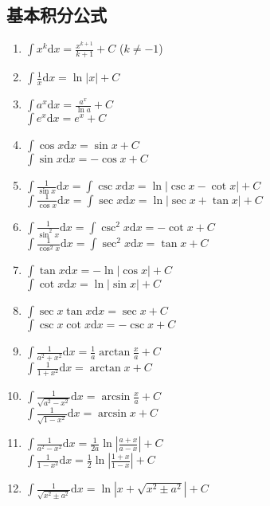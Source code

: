 \documentclass[UTF8]{ctexart}
\theoremstyle{remark}
\begin{document}
		\subsection{基本积分公式}
		\begin{enumerate}
			\item \(\int x^{k} \mathrm{d}x=\frac{x^{k + 1}}{k + 1}+C\) (\(k\neq - 1\))
			\item \(\int\frac{1}{x} \mathrm{d}x=\ln|x|+C\)
			\item \(\int a^{x} \mathrm{d}x=\frac{a^{x}}{\ln a}+C\)\\\(\int e^{x} \mathrm{d}x=e^{x}+C\)
			\item \(\int\cos x \mathrm{d}x=\sin x+C\)\\\(\int\sin x \mathrm{d}x=-\cos x+C\)
			\item \(\int\frac{1}{\sin x} \mathrm{d}x=\int\csc x \mathrm{d}x=\ln|\csc x - \cot x|+C\)\\\(\int\frac{1}{\cos x} \mathrm{d}x=\int\sec x \mathrm{d}x=\ln|\sec x + \tan x|+C\)
			\item \(\int\frac{1}{\sin^{2}x} \mathrm{d}x=\int\csc^{2}x \mathrm{d}x=-\cot x+C\)\\\(\int\frac{1}{\cos^{2}x} \mathrm{d}x=\int\sec^{2}x \mathrm{d}x=\tan x+C\)
			\item \(\int\tan x \mathrm{d}x=-\ln|\cos x|+C\)\\\(\int\cot x \mathrm{d}x=\ln|\sin x|+C\)
			\item \(\int\sec x\tan x \mathrm{d}x=\sec x+C\)\\\(\int\csc x\cot x \mathrm{d}x=-\csc x+C\)
			\item \(\int\frac{1}{a^{2}+x^{2}} \mathrm{d}x=\frac{1}{a}\arctan\frac{x}{a}+C\)\\\(\int\frac{1}{1 + x^{2}} \mathrm{d}x=\arctan x+C\)
			\item \(\int\frac{1}{\sqrt{a^{2}-x^{2}}} \mathrm{d}x=\arcsin\frac{x}{a}+C\)\\\(\int\frac{1}{\sqrt{1 - x^{2}}} \mathrm{d}x=\arcsin x+C\)
			\item \(\int\frac{1}{a^{2}-x^{2}} \mathrm{d}x=\frac{1}{2a}\ln\left|\frac{a + x}{a - x}\right|+C\)\\\(\int\frac{1}{1 - x^{2}} \mathrm{d}x=\frac{1}{2}\ln\left|\frac{1 + x}{1 - x}\right|+C\)
			\item \(\int\frac{1}{\sqrt{x^{2}\pm a^{2}}} \mathrm{d}x=\ln|x+\sqrt{x^{2}\pm a^{2}}|+C\)
		\end{enumerate}
	
\end{document}
